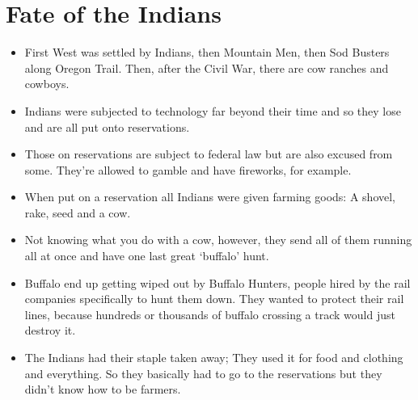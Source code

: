 \documentclass{article}
\begin{document}
\section{Fate of the Indians}
  \begin{itemize}
    \item First West was settled by Indians, then Mountain Men, then Sod Busters along Oregon Trail. Then, after the Civil War, there are cow ranches and cowboys.
    \item Indians were subjected to technology far beyond their time and so they lose and are all put onto reservations. 
    \item Those on reservations are subject to federal law but are also excused from some. They're allowed to gamble and have fireworks, for example. 
    \item When put on a reservation all Indians were given farming goods: A shovel, rake, seed and a cow. 
    \item Not knowing what you do with a cow, however, they send all of them running all at once and have one last great `buffalo' hunt.
    \item Buffalo end up getting wiped out by Buffalo Hunters, people hired by the rail companies specifically to hunt them down. They wanted to protect their rail lines, because hundreds or thousands of buffalo crossing a track would just destroy it. 
    \item The Indians had their staple taken away; They used it for food and clothing and everything. So they basically had to go to the reservations but they didn't know how to be farmers.
  \end{itemize}
\end{document}
